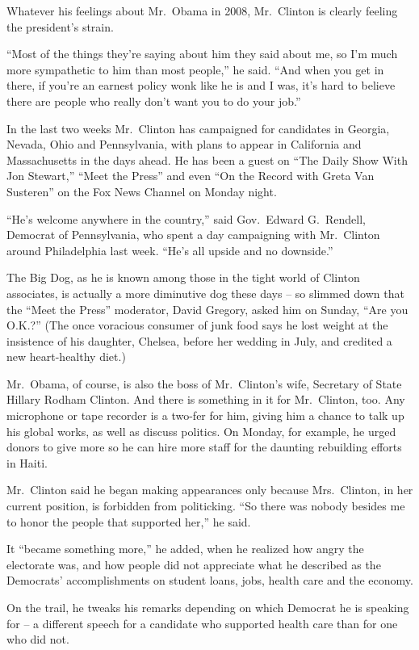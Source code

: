 ﻿\documentclass[12pt]{article}
\begin{document}
Whatever his feelings about Mr.~Obama in 2008, Mr.~Clinton is clearly feeling the president's
strain.

``Most of the things they're saying about him they said about me, so I'm much more sympathetic to
him than most people,'' he said. ``And when you get in there, if you're an earnest policy wonk like
he is and I was, it's hard to believe there are people who really don't want you to do your job.''

In the last two weeks Mr.~Clinton has campaigned for candidates in Georgia, Nevada, Ohio and
Pennsylvania, with plans to appear in California and Massachusetts in the days ahead. He has been a
guest on ``The Daily Show With Jon Stewart,'' ``Meet the Press'' and even ``On the Record with Greta
Van Susteren'' on the Fox News Channel on Monday night.

``He's welcome anywhere in the country,'' said Gov.~Edward G.~Rendell, Democrat of Pennsylvania, who
spent a day campaigning with Mr.~Clinton around Philadelphia last week. ``He's all upside and no
downside.''

The Big Dog, as he is known among those in the tight world of Clinton associates, is actually a more
diminutive dog these days -- so slimmed down that the ``Meet the Press'' moderator, David Gregory,
asked him on Sunday, ``Are you O.K.?'' (The once voracious consumer of junk food says he lost weight
at the insistence of his daughter, Chelsea, before her wedding in July, and credited a new
heart-healthy diet.)

Mr.~Obama, of course, is also the boss of Mr.~Clinton's wife, Secretary of State Hillary Rodham
Clinton. And there is something in it for Mr.~Clinton, too. Any microphone or tape recorder is a
two-fer for him, giving him a chance to talk up his global works, as well as discuss politics. On
Monday, for example, he urged donors to give more so he can hire more staff for the daunting
rebuilding efforts in Haiti.

Mr.~Clinton said he began making appearances only because Mrs.~Clinton, in her current position, is
forbidden from politicking. ``So there was nobody besides me to honor the people that supported
her,'' he said.

It ``became something more,'' he added, when he realized how angry the electorate was, and how
people did not appreciate what he described as the Democrats' accomplishments on student loans,
jobs, health care and the economy.

On the trail, he tweaks his remarks depending on which Democrat he is speaking for -- a different
speech for a candidate who supported health care than for one who did not.
\end{document}

